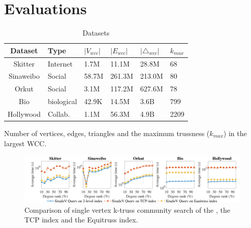 \section{Evaluations}
\label{evaluation}

\begin{table}
\caption{Datasets}
\label{table:datasets} 
\begin{threeparttable}
	\centering
		\begin{tabularx}{\linewidth}{c|*{5}{Y}} 
		\toprule
			Dataset & Type & $|V_{wcc}|$ & $|E_{wcc}|$ & $|{\triangle}_{wcc}|$ & $k_{max}$ \\
			\midrule
			Skitter & Internet & 1.7M & 11.1M & 28.8M & 68 \\ 
			Sinaweibo & Social & 58.7M & 261.3M & 213.0M & 80 \\ 
			Orkut & Social & 3.1M & 117.2M & 627.6M & 78 \\
			Bio & biological & 42.9K & 14.5M & 3.6B & 799 \\
			Hollywood & Collab. & 1.1M & 56.3M & 4.9B & 2209 \\
			\bottomrule
			\end{tabularx}
			\begin{tablenotes}
				\item Number of vertices, edges, triangles and the maximum trussness ($k_{max}$) in the largest WCC. 
			\end{tablenotes}
		\end{threeparttable}
		\vspace{-0.5cm}
\end{table}

\begin{figure}[h]
    \centering
    \includegraphics[width=0.9\linewidth, trim={0cm 0cm, 0cm, 0.3cm}, clip]{./figures/singlev_k_compare_small.pdf}
    \caption{Comparison of single vertex k-truss community search of the \twolevelindex{}, the TCP index and the Equitruss index.}
    \label{fig:singlev_k_compare}
		\vspace{-0.3cm}
\end{figure}

